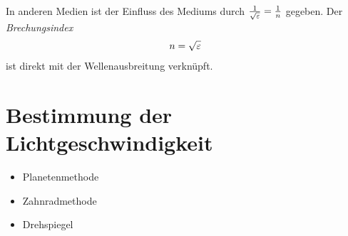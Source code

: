In anderen Medien ist der Einfluss des Mediums durch
$\frac{1}{\sqrt{\varepsilon}}=\frac{1}{n}$ gegeben. 
Der \emph{Brechungsindex} 
\begin{gather*}
  n=\sqrt{\varepsilon}
\end{gather*}%
%
ist direkt mit der Wellenausbreitung verknüpft.

\section{Bestimmung der Lichtgeschwindigkeit}
\sFolien
\begin{itemize}
\item Planetenmethode
\item Zahnradmethode
\item Drehspiegel
\end{itemize}

